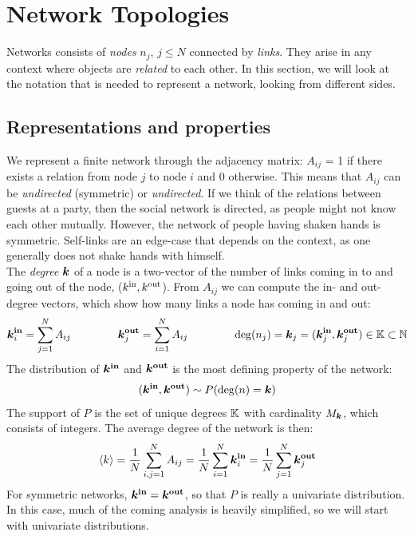 \newpage
\section{Network Topologies} \label{sec:NetworkTopologies}

Networks consists of \textsl{nodes} $n_j$, $j \leq N$ connected by \textsl{links}. They arise in any context where objects are \textsl{related} to each other. In this section, we will look at the notation that is needed to represent a network, looking from different sides. 

\subsection{Representations and properties}
We represent a finite network through the adjacency matrix: $A_{ij} $ = 1 if there exists a relation from node $j$ to node $i$ and 0 otherwise. This means that $A_{ij}$ can be \textsl{undirected} (symmetric) or \textsl{undirected}. If we think of the relations between guests at a party, then the social network is directed, as people might not know each other mutually. However, the network of people having shaken hands is symmetric. Self-links are an edge-case that depends on the context, as one generally does not shake hands with himself. \\
The \textsl{degree} ${\boldsymbol{k}}$ of a node is a two-vector of the number of links coming in to and going out of the node, (${k^{\rm in}}, {k^{\rm out}}$). From $A_{ij}$ we can compute the in- and out-degree vectors, which show how many links a node has coming in and out:
\begin{align}
\kinbi = \sum_{j=1}^{N} A_{i j} \hspace{15mm} \koutbj = \sum_{i=1}^{N} A_{i j}  \hspace{15mm} \degree(n_j) = \k_j = (\boldsymbol{k}_j^{\bf in}, \koutbj) \in \K \subset \mathbb{N} \label{eq:definekinkoutfromA} 
\end{align}
The distribution of ${\boldsymbol{k^{\rm in}}}$ and $\boldsymbol{{k^{\rm out}}}$ is the most defining property of the network:
\begin{align}
({\boldsymbol{k^{\rm in}}}, \boldsymbol{{k^{\rm out}}}) \sim P({\rm deg}(n) = {\boldsymbol{k}}) \label{eq:definekinkoutfromP} 
\end{align}
The support of $P$ is the set of unique degrees ${\mathbb{K}}$ with cardinality $M_{\boldsymbol{k}}$, which consists of integers. The average degree of the network is then: 
\begin{align}
{\langle k\rangle} = \frac{1}{N} \sum_{i,j=1}^{N} A_{ij} = \frac{1}{N} \sum_{i=1}^{N} {\boldsymbol{k}_i^{\bf in}} = \frac{1}{N} \sum_{j=1}^{N} {\boldsymbol{k}_j^{\bf out}} \label{eq:kmean} 
\end{align}
For symmetric networks, ${\boldsymbol{k^{\rm in}}} = \boldsymbol{{k^{\rm out}}}$, so that $P$ is really a univariate distribution. In this case, much of the coming analysis is heavily simplified, so we will start with univariate distributions.


